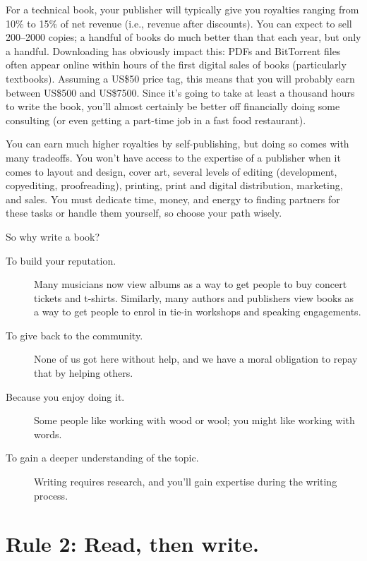 \documentclass[10pt,letterpaper]{article}
\begin{document}
For a technical book, your publisher will typically give you royalties ranging from 10\% to 15\% of net revenue
(i.e., revenue after discounts).
You can expect to sell 200–2000 copies;
a handful of books do much better than that each year,
but only a handful.
Downloading has obviously impact this:
PDFs and BitTorrent files often appear online
within hours of the first digital sales of books (particularly textbooks).
Assuming a US\$50 price tag,
this means that you will probably earn between US\$500 and US\$7500.
Since it's going to take at least a thousand hours to write the book,
you'll almost certainly be better off financially doing some consulting
(or even getting a part-time job in a fast food restaurant).

You can earn much higher royalties by self-publishing,
but doing so comes with many tradeoffs.
You won't have access to the expertise of a publisher
when it comes to layout and design, cover art,
several levels of editing (development, copyediting, proofreading),
printing, print and digital distribution, marketing, and sales.
You must dedicate time, money, and energy to finding partners for these tasks or handle them yourself,
so choose your path wisely. 

So why write a book?

\begin{description}

\item[To build your reputation.]
    Many musicians now view albums as a way to get people to buy concert tickets and t-shirts.
    Similarly, many authors and publishers view books as a way to get people
    to enrol in tie-in workshops and speaking engagements.

\item[To give back to the community.]
    None of us got here without help,
    and we have a moral obligation to repay that by helping others.

\item[Because you enjoy doing it.]
    Some people like working with wood or wool;
    you might like working with words.

\item[To gain a deeper understanding of the topic.]
    Writing requires research,
    and you'll gain expertise during the writing process.

\end{description}

\section*{Rule 2: Read, then write.}
\end{document}

